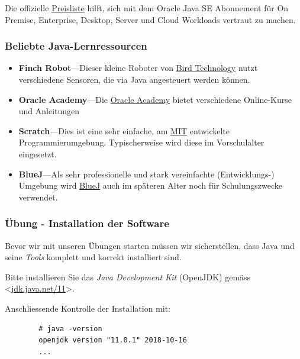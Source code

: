 Die offizielle \href{https://www.oracle.com/corporate/pricing/#java-se}
{Preisliste} hilft, sich mit dem Oracle Java SE Abonnement für On Premise,
Enterprise, Desktop, Server und Cloud Workloads vertraut zu machen.


\begin{frame}[fragile]
    \frametitle<presentation>{Beliebte Java-Lernressourcen}

    \begin{itemize}
        \item\textbf{Finch Robot}---Dieser kleine Roboter von
        \href{https://www.birdbraintechnologies.com/finch/}
        {Bird Technology} nutzt verschiedene Sensoren,
        die via Java angesteuert werden können.
        \item\textbf{Oracle Academy}---Die
        \href{https://academy.oracle.com/en/training-self-study.html}
        {Oracle Academy} bietet verschiedene
        Online-Kurse und Anleitungen
        \item\textbf{Scratch}---Dies ist eine sehr einfache, am
        \href{https://scratch.mit.edu/}{MIT} entwickelte Programmierumgebung.
        Typischerweise wird diese im Vorschulalter eingesetzt.
        \item\textbf{BlueJ}---Als sehr professionelle und stark vereinfachte
        (Entwicklungs-) Umgebung wird \href{http://www.bluej.org/}{BlueJ}
        auch im späteren Alter noch für Schulungszwecke verwendet.
    \end{itemize}

\end{frame}


%
%
\begin{frame}[fragile]
    \frametitle{Übung - Installation der Software}
    Bevor wir mit unseren Übungen starten müssen wir sicherstellen,
    dass Java und seine {\em Tools} komplett und korrekt installiert sind.

    Bitte installieren Sie das {\em Java Development Kit} (OpenJDK) gemäss
    <\href{https://jdk.java.net/11/}{jdk.java.net/11}>.

    \vfill
    Anschliessende Kontrolle der Installation mit:

    \begin{verbatim}
        # java -version
        openjdk version "11.0.1" 2018-10-16
        ...
    \end{verbatim}

\end{frame}


